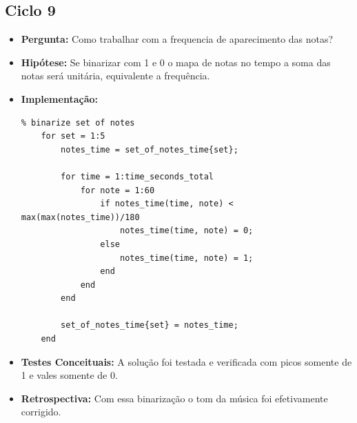 \subsection{Ciclo 9}
\begin{itemize}
\item \textbf{Pergunta:} Como trabalhar com a frequencia de aparecimento das notas?
\item \textbf{Hipótese:} Se binarizar com 1 e 0 o mapa de notas no tempo a soma das notas será unitária, equivalente a frequência.
\item \textbf{Implementação:} 
\begin{lstlisting}
% binarize set of notes
    for set = 1:5
        notes_time = set_of_notes_time{set};
        
        for time = 1:time_seconds_total
            for note = 1:60
                if notes_time(time, note) < max(max(notes_time))/180
                    notes_time(time, note) = 0;
                else
                    notes_time(time, note) = 1;
                end
            end
        end

        set_of_notes_time{set} = notes_time;
    end
\end{lstlisting}
\item \textbf{Testes Conceituais:} A solução foi testada e verificada com picos somente de 1 e vales somente de 0. 
\item \textbf{Retrospectiva:} Com essa binarização o tom da música foi efetivamente corrigido.
\end{itemize}

